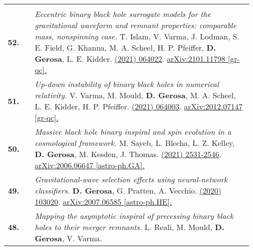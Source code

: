 {\begin{longtable}{rp{0.3cm}p{15.8cm}}
\vspace{0.09cm}\\
%
\textbf{52.} & & \textit{Eccentric binary black hole surrogate models for the gravitational waveform and remnant properties: comparable mass, nonspinning case.}
\newline{}
T. Islam, V. Varma, J. Lodman, S. E. Field, G. Khanna, M. A. Scheel, H. P. Pfeiffer,  \textbf{D. Gerosa}, L. E. Kidder.
\newline{}
\href{https://journals.aps.org/prd/abstract/10.1103/PhysRevD.103.064022}{\prd 103 (2021) 064022}. \href{https://arxiv.org/abs/2101.11798}{arXiv:2101.11798 [gr-qc].}
\vspace{0.09cm}\\
%
\textbf{51.} & & \textit{Up-down instability of binary black holes in numerical relativity.}
\newline{}
V. Varma, M. Mould, \textbf{D. Gerosa}, M. A. Scheel, L. E. Kidder, H. P. Pfeiffer.
\newline{}
\href{https://journals.aps.org/prd/abstract/10.1103/PhysRevD.103.064003}{\prd 103 (2021) 064003}. \href{https://arxiv.org/abs/2012.07147}{arXiv:2012.07147 [gr-qc].}
\vspace{0.09cm}\\
%
\textbf{50.} & & \textit{Massive black hole binary inspiral and spin evolution in a cosmological framework.}
\newline{}
M. Sayeb, L. Blecha, L. Z. Kelley, \textbf{D. Gerosa}, M. Kesden, J. Thomas.
\newline{}
\href{https://doi.org/10.1093/mnras/staa3826}{\mnras 501 (2021) 2531-2546}. \href{https://arxiv.org/abs/2006.06647}{arXiv:2006.06647 [astro-ph.GA].}
\vspace{0.09cm}\\
%
\textbf{49.} & & \textit{Gravitational-wave selection effects using neural-network classifiers.}
\newline{}
\textbf{D. Gerosa}, G. Pratten, A. Vecchio.
\newline{}
\href{https://journals.aps.org/prd/abstract/10.1103/PhysRevD.102.103020}{\prd 102 (2020) 103020}. \href{https://arxiv.org/abs/2007.06585}{arXiv:2007.06585 [astro-ph.HE].}
\vspace{0.09cm}\\
%
\textbf{48.} & & \textit{Mapping the asymptotic inspiral of precessing binary black holes to their merger remnants.}
\newline{}
L. Reali, M. Mould, \textbf{D. Gerosa}, V. Varma.
\newline{}

\end{longtable}}

